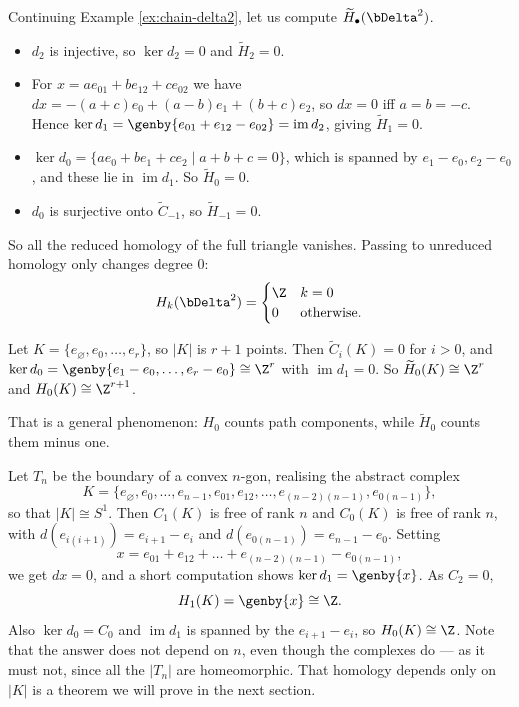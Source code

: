\begin{example} \label{ex:homology-delta2}
	Continuing Example \ref{ex:chain-delta2}, let us compute $\widetilde H_\bullet(\bDelta^2)$.
	\begin{itemize}
		\item $d_2$ is injective, so $\ker d_2 = 0$ and $\widetilde H_2 = 0$.
		\item For $x = ae_{01}+be_{12}+ce_{02}$ we have $dx = -(a+c)e_0 + (a-b)e_1 + (b+c)e_2$, so $dx = 0$ iff $a = b = -c$. Hence $\ker d_1 = \genby{e_{01}+e_{12}-e_{02}} = \operatorname{im}d_2$, giving $\widetilde H_1 = 0$.
		\item $\ker d_0 = \{ae_0+be_1+ce_2 \mid a+b+c = 0\}$, which is spanned by $e_1-e_0, e_2-e_0$, and these lie in $\operatorname{im}d_1$. So $\widetilde H_0 = 0$.
		\item $d_0$ is surjective onto $\widetilde C_{-1}$, so $\widetilde H_{-1} = 0$.
	\end{itemize}
	So all the reduced homology of the full triangle vanishes. Passing to unreduced homology only changes degree $0$:
	$$
	H_k(\bDelta^2) = \begin{cases}\Z & k = 0\\ 0 & \text{otherwise.}\end{cases}
	$$
\end{example}

\begin{example} \label{ex:homology-points}
	Let $K = \{e_\varnothing, e_0, \dots, e_r\}$, so $|K|$ is $r+1$ points. Then $\widetilde C_i(K) = 0$ for $i > 0$, and $\ker d_0 = \genby{e_1-e_0,\dots,e_r-e_0} \cong \Z^r$ with $\operatorname{im}d_1 = 0$. So $\widetilde H_0(K) \cong \Z^r$ and $H_0(K) \cong \Z^{r+1}$.
\end{example}

That is a general phenomenon: $H_0$ counts path components, while $\widetilde H_0$ counts
them minus one.

\begin{example} \label{ex:homology-circle}
	Let $T_n$ be the boundary of a convex $n$-gon, realising the abstract complex
	$$
	K = \{e_\varnothing, e_0,\dots,e_{n-1}, e_{01},e_{12},\dots,e_{(n-2)(n-1)}, e_{0(n-1)}\},
	$$
	so that $|K| \cong S^1$. Then $C_1(K)$ is free of rank $n$ and $C_0(K)$ is free of rank $n$, with $d(e_{i(i+1)}) = e_{i+1}-e_i$ and $d(e_{0(n-1)}) = e_{n-1}-e_0$. Setting
	$$
	x = e_{01}+e_{12}+\dots+e_{(n-2)(n-1)} - e_{0(n-1)},
	$$
	we get $dx = 0$, and a short computation shows $\ker d_1 = \genby{x}$. As $C_2 = 0$,
	$$
	H_1(K) = \genby{x} \cong \Z.
	$$
	Also $\ker d_0 = C_0$ and $\operatorname{im}d_1$ is spanned by the $e_{i+1}-e_i$, so $H_0(K) \cong \Z$. Note that the answer does not depend on $n$, even though the complexes do --- as it must not, since all the $|T_n|$ are homeomorphic. That homology depends only on $|K|$ is a theorem we will prove in the next section.
\end{example}

